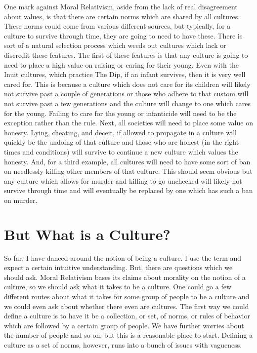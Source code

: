 One mark against Moral Relativism, aside from the lack of real disagreement about values, is that there are certain norms which are shared by all cultures. These norms could come from various different sources, but typically, for a culture to survive through time, they are going to need to have these. There is sort of a natural selection process which weeds out cultures which lack or discredit these features. The first of these features is that any culture is going to need to place a high value on raising or caring for their young. Even with the Inuit cultures, which practice The Dip, if an infant survives, then it is very well cared for. This is because a culture which does not care for its children will likely not survive past a couple of generations or those who adhere to that custom will not survive past a few generations and the culture will change to one which cares for the young. Failing to care for the young or infanticide will need to be the exception rather than the rule. Next, all societies will need to place some value on honesty. Lying, cheating, and deceit, if allowed to propagate in a culture will quickly be the undoing of that culture and those who are honest (in the right times and conditions) will survive to continue a new culture which values the honesty. And, for a third example, all cultures will need to have some sort of ban on needlessly killing other members of that culture. This should seem obvious but any culture which allows for murder and killing to go unchecked will likely not survive through time and will eventually be replaced by one which has such a ban on murder. 

\section{But What is a Culture?}

So far, I have danced around the notion of being a culture. I use the term and expect a certain intuitive understanding. But, there are questions which we should ask. Moral Relativism bases its claims about morality on the notion of a culture, so we should ask what it takes to be a culture. One could go a few different routes about what it takes for some group of people to be a culture and we could even ask about whether there even are cultures. The first way we could define a culture is to have it be a collection, or set, of norms, or rules of behavior which are followed by a certain group of people. We have further worries about the number of people and so on, but this is a reasonable place to start. Defining a culture as a set of norms, however, runs into a bunch of issues with vagueness.

